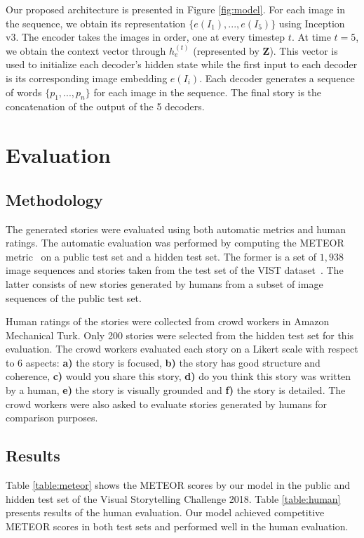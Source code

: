 \documentclass[11pt,a4paper]{article}
\begin{document}
Our proposed architecture is presented in Figure \ref{fig:model}. For each image in the sequence, we obtain its representation $\{e(I_1),...,e(I_5)\}$ using Inception v3. The encoder takes the images in order, one at every timestep $t$. At time $t=5$, we obtain the context vector through $h_e^{(t)}$ (represented by $\mathbf{Z}$). This vector is used to initialize each decoder's hidden state while the first input to each decoder is its corresponding image embedding $e(I_i)$. Each decoder generates a sequence of words $\{p_1,...,p_{n}\}$ for each image in the sequence. The final story is the concatenation of the output of the 5 decoders.

\section{Evaluation}

\subsection{Methodology}
The generated stories were evaluated using both automatic metrics and human ratings.
The automatic evaluation was performed by computing the METEOR metric~\cite{banerjee} on a public test set and a hidden test set. 
The former is a set of $1,938$ image sequences and stories taken from the test set of the VIST dataset~\cite{huang2016}. 
The latter consists of new stories generated by humans from a subset of image sequences of the public test set.
 
 Human ratings of the stories were collected from crowd workers in Amazon Mechanical Turk. 
 Only 200 stories were selected from the hidden test set for this evaluation. 
 The crowd workers evaluated each story on a Likert scale with respect to 6 aspects: \textbf{a)} the story is focused, \textbf{b)} the story has good structure and coherence, \textbf{c)} would you share this story, \textbf{d)} do you think this story was written by a human, \textbf{e)} the story is visually grounded and \textbf{f)} the story is detailed. 
 The crowd workers were also asked to evaluate stories generated by humans for comparison purposes.

\subsection{Results}
Table \ref{table:meteor} shows the METEOR scores by our model in the public and hidden test set of the Visual Storytelling Challenge 2018. 
 Table \ref{table:human} presents results of the human evaluation. Our model achieved competitive METEOR scores in both test sets and performed well in the human evaluation.
 
\end{document}
